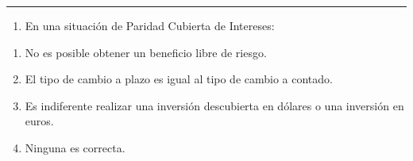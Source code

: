 \documentclass[
  letterpaper,
  DIV=11,
  numbers=noendperiod]{scrreprt}
\providecommand{\tightlist}{%
  \setlength{\itemsep}{0pt}\setlength{\parskip}{0pt}}\usepackage{longtable,booktabs,array}
\begin{document}
\begin{center}\rule{0.5\linewidth}{0.5pt}\end{center}

\begin{enumerate}
\def\labelenumi{\arabic{enumi}.}
\setcounter{enumi}{17}
\tightlist
\item
  En una situación de Paridad Cubierta de Intereses:
\end{enumerate}

\begin{enumerate}
\def\labelenumi{\alph{enumi})}
\item
  No es posible obtener un beneficio libre de riesgo.
\item
  El tipo de cambio a plazo es igual al tipo de cambio a contado.
\item
  Es indiferente realizar una inversión descubierta en dólares o una
  inversión en euros.
\item
  Ninguna es correcta.
\end{enumerate}
\end{document}
